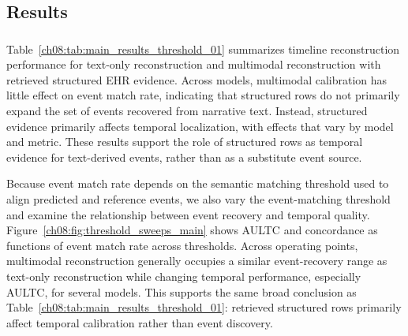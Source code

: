 \subsection{Results}
\label{ch08:sec:results}
\ChEightHeadingOnly


\subsubsection{}
\label{ch08:sec:main_results}

Table~\ref{ch08:tab:main_results_threshold_01} summarizes timeline reconstruction performance for text-only reconstruction and multimodal reconstruction with retrieved structured EHR evidence.
Across models, multimodal calibration has little effect on event match rate, indicating that structured rows do not primarily expand the set of events recovered from narrative text.
Instead, structured evidence primarily affects temporal localization, with effects that vary by model and metric.
These results support the role of structured rows as temporal evidence for text-derived events, rather than as a substitute event source.


Because event match rate depends on the semantic matching threshold used to align predicted and reference events, we also vary the event-matching threshold and examine the relationship between event recovery and temporal quality.
Figure~\ref{ch08:fig:threshold_sweeps_main} shows AULTC and concordance as functions of event match rate across thresholds.
Across operating points, multimodal reconstruction generally occupies a similar event-recovery range as text-only reconstruction while changing temporal performance, especially AULTC, for several models.
This supports the same broad conclusion as Table~\ref{ch08:tab:main_results_threshold_01}: retrieved structured rows primarily affect temporal calibration rather than event discovery.



